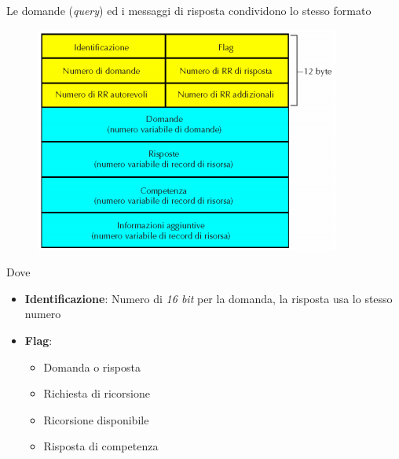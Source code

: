 \documentclass{article}
\newcounter{subsubsubsection}[subsubsection]
\begin{document}
                    Le domande (\textit{query}) ed i messaggi di risposta condividono lo stesso formato
                    \begin{figure}[H]
                        \centering
                        \includegraphics[width=\textwidth]{pic/messaggio_dns.png}
                        \label{}
                    \end{figure} 
                    Dove
                    \begin{itemize}
                        \item \textbf{Identificazione}: Numero di \textit{16 bit} per la domanda, la risposta usa lo stesso numero
                        \item \textbf{Flag}:
                              \begin{itemize}
                                  \item Domanda o risposta
                                  \item Richiesta di ricorsione
                                  \item Ricorsione disponibile
                                  \item Risposta di competenza
                              \end{itemize}
                    \end{itemize}
        
\end{document}
